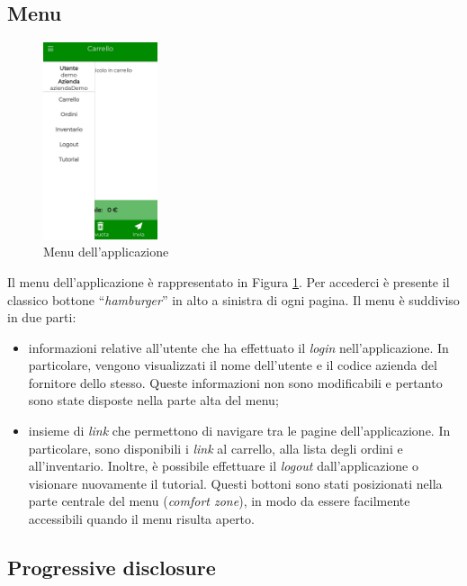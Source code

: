 \documentclass[12pt, a4paper, titlepage]{report}
\begin{document}
	\subsection{Menu}
	
	\begin{figure}[H] 
		\centering
		\includegraphics[width=0.3\textwidth]{img/menu}
		\caption{Menu dell'applicazione}
		\label{fig:menu}
	\end{figure}
	Il menu dell'applicazione è rappresentato in Figura \ref{fig:menu}. Per accederci è presente il classico bottone ``\textit{hamburger}'' in alto a sinistra di ogni pagina. Il menu è suddiviso in due parti: 
	\begin{itemize}
		\item informazioni relative all'utente che ha effettuato il \textit{login} nell'applicazione. In particolare, vengono visualizzati il nome dell'utente e il codice azienda del fornitore dello stesso. Queste informazioni non sono modificabili e pertanto sono state disposte nella parte alta del menu;
		\item insieme di \textit{link} che permettono di navigare tra le pagine dell'applicazione. In particolare, sono disponibili i \textit{link} al carrello, alla lista degli ordini e all'inventario. Inoltre, è possibile effettuare il \textit{logout} dall'applicazione o visionare nuovamente il tutorial. Questi bottoni sono stati posizionati nella parte centrale del menu (\textit{comfort zone}), in modo da essere facilmente accessibili quando il menu risulta aperto.
	\end{itemize}

	\subsection{Progressive disclosure}
	
\end{document}
